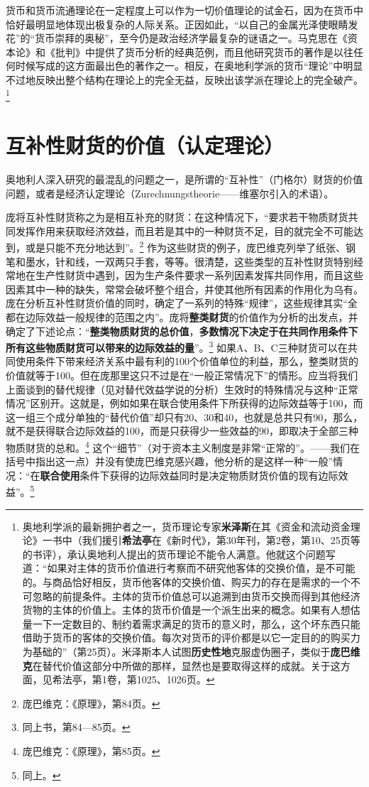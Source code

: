 \documentclass[fontset=fandol, a4paper, 12pt, openright]{ctexbook}
\begin{document}
货币和货币流通理论在一定程度上可以作为一切价值理论的试金石，因为在货币中恰好最明显地体现出极复杂的人际关系。正因如此，“以自己的金属光泽使眼睛发花”的“货币崇拜的奥秘”，至今仍是政治经济学最复杂的谜语之一。马克思在《资本论》和《批判》中提供了货币分析的经典范例，而且他研究货币的著作是以往任何时候写成的这方面最出色的著作之一。相反，在奥地利学派的货币“理论”中明显不过地反映出整个结构在理论上的完全无益，反映出该学派在理论上的完全破产。\footnote{奥地利学派的最新拥护者之一，货币理论专家\textbf{米泽斯}在其《资金和流动资金理论》一书中（我们援引\textbf{希法亭}在《新时代》，第30年刊，第2卷，第10、25页等的书评），承认奥地利人提出的货币理论不能令人满意。他就这个问题写道：“如果对主体的货币价值进行考察而不研究他客体的交换价值，是不可能的。与商品恰好相反，货币他客体的交换价值、购买力的存在是需求的一个不可忽略的前提条件。主体的货币价值总可以追溯到由货币交换而得到其他经济货物的主体的价值上。主体的货币价值是一个派生出来的概念。如果有人想估量一下一定数目的、制约着需求满足的货币的意义时，那么，这个坏东西只能借助于货币的客体的交换价值。每次对货币的评价都是以它一定目的的购买力为基础的”（第25页）。米泽斯本人试图\textbf{历史性地}克服虚伪圈子，类似于\textbf{庞巴维克}在替代价值这部分中所做的那样，显然也是要取得这样的成就。关于这方面，见希法亭，第1卷，第1025、1026页。}

\section{互补性财货的价值（认定理论）}

奥地利人深入研究的最混乱的问题之一，是所谓的“互补性”（门格尔）财货的价值问题，或者是经济认定理论（Zurechnungstheorie——维塞尔引入的术语）。

庞将互补性财货称之为是相互补充的财货：在这种情况下，“要求若干物质财货共同发挥作用来获取经济效益，而且若是其中的一种财货不足，目的就完全不可能达到，或是只能不充分地达到”。\footnote{庞巴维克：《原理》，第84页。} 作为这些财货的例子，庞巴维克列举了纸张、钢笔和墨水，针和线，一双两只手套，等等。很清楚，这些类型的互补性财货特别经常地在生产性财货中遇到，因为生产条件要求一系列因素发挥共同作用，而且这些因素其中一种的缺失，常常会破坏整个组合，并使其他所有因素的作用化为乌有。庞在分析互补性财货价值的同时，确定了一系列的特殊“规律”，这些规律其实“全都在边际效益一般规律的范围之内”。庞将\textbf{整类财货}的价值作为分析的出发点，并确定了下述论点：“\textbf{整类物质财货的总价值}，\textbf{多数情况下决定于在共同作用条件下所有这些物质财货可以带来的边际效益的量}”。\footnote{同上书，第84—85页。} 如果A、B、C三种财货可以在共同使用条件下带来经济关系中最有利的100个价值单位的利益，那么，整类财货的价值就等于100。但在庞那里这只不过是在“一般正常情况下”的情形。应当将我们上面谈到的替代规律（见对替代效益学说的分析）生效时的特殊情况与这种“正常情况”区别开。这就是，例如如果在联合使用条件下所获得的边际效益等于100，而这一组三个成分单独的“替代价值”却只有20、30和40，也就是总共只有90，那么，就不是获得联合边际效益的100，而是只获得少一些效益的90，即取决于全部三种物质财货的总和。\footnote{庞巴维克：《原理》，第85页。} 这个“细节”（对于资本主义制度是非常“正常的”。——我们在括号中指出这一点）并没有使庞巴维克感兴趣，他分析的是这样一种“一般”情况：“在\textbf{联合使用}条件下获得的边际效益同时是决定物质财货价值的现有边际效益”。\footnote{同上。}
\end{document}
